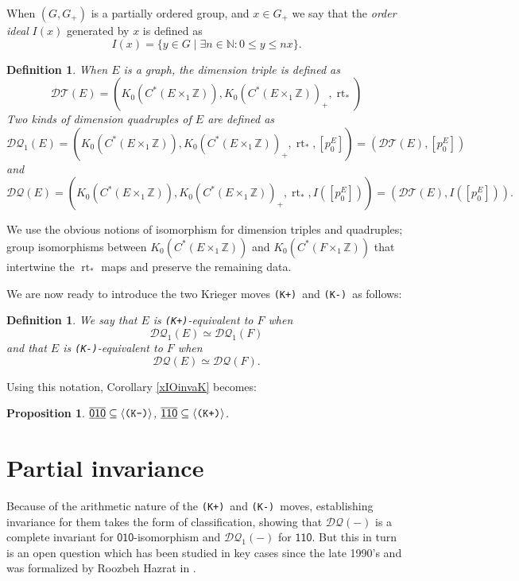 \documentclass[12pt]{amsbook}%
\newcommand{\lt}{\operatorname{rt}}
\newtheorem{propo}[theor]{Proposition}
\theoremstyle{defin}
\newtheorem{defin}[theor]{Definition}
\theoremstyle{remark}
\numberwithin{equation}{chapter}
\numberwithin{theor}{section}
\newcommand{\NN}{\mathbb{N}}
\newcommand{\ZZ}{\mathbb{Z}}
\newcommand{\xyz}[1]{\mbox{$\mathsf{#1}$}}
\newcommand{\xyzrel}[1]{\mbox{$\overline{\underline{\mathsf{ #1}}}$}}
\newcommand{\KKKp}{\mbox{\texttt{\textup{(K+)}}}}
\newcommand{\KKKm}{\mbox{\texttt{\textup{(K-)}}}}
\newcommand{\DT}{\mathcal{DT}}
\newcommand{\DQ}{\mathcal{DQ}}
\newcommand{\DQp}{\mathcal{DQ}_1}
\begin{document}
 When $(G,G_+)$ is a partially ordered group, and $x\in G_+$ we say that the \emph{order ideal} $I(x)$ generated by $x$ is defined as
\[
I(x)=\{y\in G\mid \exists n\in\NN: 0\leq y\leq nx\}.
\] 





\begin{defin}\index{DQ@$\DQ(-)$}\index{Kp@$\KKKp$}\index{DQp@$\DQp(-)$}\index{Km@$\KKKm$}\label{KKKp}
When $E$ is a graph, the \emph{dimension triple} is defined as
\[
\DT(E)=(K_0(C^*(E\times_1\ZZ)),K_0(C^*(E\times_1\ZZ))_+,\lt_*)
\]\index{DT@$\DT(-)$}
Two kinds of \emph{dimension quadruples} of $E$ are defined as
\[
\DQp(E)=(K_0(C^*(E\times_1\ZZ)),K_0(C^*(E\times_1\ZZ))_+,\lt_*,[p_0^E])=(\DT(E),[p_0^E])
\]
and
\[
\DQ(E)=(K_0(C^*(E\times_1\ZZ)),K_0(C^*(E\times_1\ZZ))_+,\lt_*,I([p_0^E]))=(\DT(E),I([p_0^E])).
\]
\end{defin}

We use the obvious notions of isomorphism for dimension triples and quadruples; group isomorphisms between $K_0(C^*(E\times_1\ZZ))$ and $K_0(C^*(F\times_1\ZZ))$ that intertwine the $\lt_*$ maps and preserve the remaining data.

We are now ready to introduce the two Krieger moves \KKKp\ and \KKKm\ as follows:

\begin{defin}
We say that $E$ is \KKKp-equivalent to $F$ when
\[
\DQp(E)\simeq \DQp(F)
\]
and that $E$ is \KKKm-equivalent to $F$ when
\[
\DQ(E)\simeq \DQ(F).
\]
\end{defin}

Using this notation, Corollary \ref{xIOinvaK} becomes:

\begin{propo}\label{KKpremembers}
 $\xyzrel{010}\subseteq\langle\KKKm\rangle$,  $\xyzrel{110}\subseteq\langle\KKKp\rangle$.
\end{propo}




 



\section{Partial invariance}\label{hazratdisc}

Because of the arithmetic nature
of the \KKKp\ and \KKKm\ moves,
establishing invariance for them takes the
form of classification, showing that
$\DQ(-)$ is a complete invariant for \xyz{010}-isomorphism
and $\DQp(-)$ for \xyz{110}. But this in turn is
an open question which has been
studied in key cases
since the late 1990's and was formalized
by Roozbeh Hazrat in \cite{rh:ggclpa}.
\end{document}
